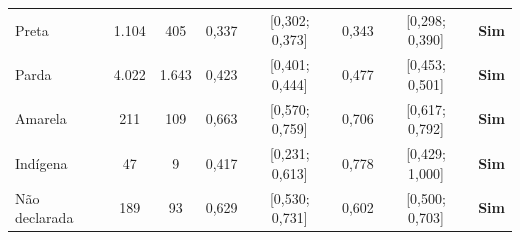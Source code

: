 \begin{table}[htbp]
{\begin{tabular}{lccccccc}
\quad Preta & 1.104 & 405 & 0,337 & [0,302; 0,373] & 0,343 & [0,298; 0,390] & \textbf{Sim} \\
\quad Parda & 4.022 & 1.643 & 0,423 & [0,401; 0,444] & 0,477 & [0,453; 0,501] & \textbf{Sim} \\
\quad Amarela & 211 & 109 & 0,663 & [0,570; 0,759] & 0,706 & [0,617; 0,792] & \textbf{Sim} \\
\quad Indígena & 47 & 9 & 0,417 & [0,231; 0,613] & 0,778 & [0,429; 1,000] & \textbf{Sim} \\
\quad Não declarada & 189 & 93 & 0,629 & [0,530; 0,731] & 0,602 & [0,500; 0,703] & \textbf{Sim} \\
\bottomrule
\end{tabular}}
\end{table}
